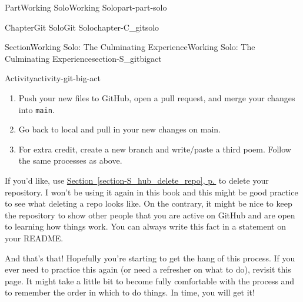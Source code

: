 \documentclass[twoside,10pt,]{book}
\newcommand{\xreffont}{\relax}
\newcommand{\mono}[1]{\texttt{#1}}
\begin{document}
\begin{partptx}{Part}{Working Solo}{}{Working Solo}{}{}{part-part-solo}
\begin{chapterptx}{Chapter}{Git Solo}{}{Git Solo}{}{}{chapter-C_gitsolo}
\begin{sectionptx}{Section}{Working Solo: The Culminating Experience}{}{Working Solo: The Culminating Experience}{}{}{section-S_gitbigact}
\begin{activity}{Activity}{}{activity-git-big-act}
\begin{enumerate}[font=\bfseries,label=(\alph*),ref=\alph*]
\par
Create a new file titled \mono{poem2.md}. Open it and add your second original poem or paste your second-favorite poem (with attribution, of course!). Stage this file and commit it with a good commit message.%
\item{}Push your new files to GitHub, open a pull request, and merge your changes into \mono{main}.%
\item{}Go back to local and pull in your new changes on main.%
\item{}For extra credit, create a new branch and write\slash{}paste a third poem. Follow the same processes as above.%
\end{enumerate}%
If you'd like, use \hyperref[section-S_hub_delete_repo]{Section~{\xreffont\ref{section-S_hub_delete_repo}}, p.\,\pageref{section-S_hub_delete_repo}} to delete your repository. I won't be using it again in this book and this might be good practice to see what deleting a repo looks like. On the contrary, it might be nice to keep the repository to show other people that you are active on GitHub and are open to learning how things work. You can always write this fact in a statement on your README.%
\end{activity}%
And that's that! Hopefully you're starting to get the hang of this process. If you ever need to practice this again (or need a refresher on what to do), revisit this page. It might take a little bit to become fully comfortable with the process and to remember the order in which to do things. In time, you will get it!%
\end{sectionptx}
\end{chapterptx}
\end{partptx}
%
%
\typeout{************************************************}
\typeout{************************************************}
%
\end{document}
